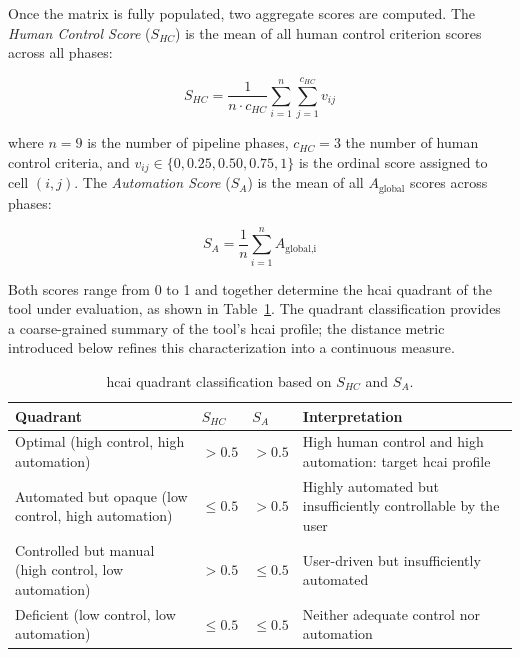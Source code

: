 \documentclass[a4paper,twoside]{article}
\begin{document}
Once the matrix is fully populated, two aggregate scores are computed. The
\emph{Human Control Score} ($S_{HC}$) is the mean of all human control
criterion scores across all phases:

\begin{equation}
    S_{HC} = \frac{1}{n \cdot c_{HC}} \sum_{i=1}^{n} \sum_{j=1}^{c_{HC}} v_{ij}
    \label{eq:shc}
\end{equation}

\noindent where $n = 9$ is the number of pipeline phases, $c_{HC} = 3$ the
number of human control criteria, and $v_{ij} \in \{0, 0.25, 0.50, 0.75, 1\}$
is the ordinal score assigned to cell $(i, j)$. The \emph{Automation Score}
($S_{A}$) is the mean of all $A_{\text{global}}$ scores across phases:

\begin{equation}
    S_{A} = \frac{1}{n} \sum_{i=1}^{n} A_{\text{global},\text{i}}
    \label{eq:sa}
\end{equation}

Both scores range from 0 to 1 and together determine the \gls{hcai} quadrant
of the tool under evaluation, as shown in Table~\ref{tab:quadrants}. The
quadrant classification provides a coarse-grained summary of the tool's
\gls{hcai} profile; the distance metric introduced below refines this
characterization into a continuous measure.

\begin{table}[ht]
\caption{\gls{hcai} quadrant classification based on $S_{HC}$ and $S_{A}$.}
\label{tab:quadrants}
\centering
\begin{tabular}{lllp{6cm}}
\toprule
\textbf{Quadrant} & $S_{HC}$ & $S_{A}$ & \textbf{Interpretation} \\
\midrule
Optimal (high control, high automation)        & $> 0.5$ & $> 0.5$ & High human control and high automation: target \gls{hcai} profile \\
Automated but opaque (low control, high automation)  & $\leq 0.5$ & $> 0.5$ & Highly automated but insufficiently controllable by the user \\
Controlled but manual (high control, low automation) & $> 0.5$ & $\leq 0.5$ & User-driven but insufficiently automated \\
Deficient (low control, low automation)        & $\leq 0.5$ & $\leq 0.5$ & Neither adequate control nor automation \\
\bottomrule
\end{tabular}
\end{table}
\end{document}
